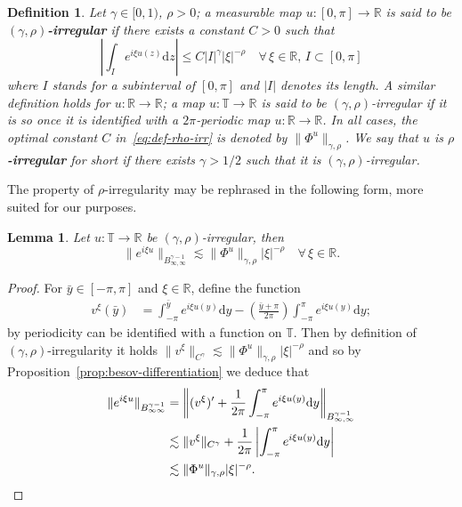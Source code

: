\documentclass[11pt,oneside,reqno]{amsart}
\newcommand{\mathd}{\mathrm{d}}
\newcommand{\tmdfn}[1]{\textbf{#1}}
\newtheorem{definition}[theorem]{Definition}
\newtheorem{lemma}[theorem]{Lemma}
\numberwithin{equation}{section}
\begin{document}
\begin{definition}
  \label{def:rho-irr}Let $\gamma \in [0, 1)$, $\rho > 0$; a measurable map $u
  : [0, \pi] \rightarrow \mathbb{R}$ is said to be {\tmdfn{$(\gamma,
  \rho)$-irregular}} if there exists a constant $C > 0$ such that
  \begin{equation}
    \left| \int_I e^{i \xi u (z)} \mathd z \right| \leqslant C | I |^{\gamma} 
    | \xi |^{- \rho} \quad \forall \, \xi \in \mathbb{R}, \, I \subset [0,
    \pi] \label{eq:def-rho-irr}
  \end{equation}
  where $I$ stands for a subinterval of $[0, \pi]$ and $| I |$ denotes its
  length. A similar definition holds for $u : \mathbb{R} \rightarrow
  \mathbb{R}$; a map $u : \mathbb{T} \rightarrow \mathbb{R}$ is said to be
  $(\gamma, \rho)$-irregular if it is so once it is identified with a $2
  \pi$-periodic map $u : \mathbb{R} \rightarrow \mathbb{R}$. In all cases, the
  optimal constant $C$ in~\eqref{eq:def-rho-irr} is denoted by $\| \Phi^u
  \|_{\gamma, \rho}$. We say that $u$ is {\tmdfn{$\rho$-irregular}} for short
  if there exists $\gamma > 1 / 2$ such that it is $(\gamma, \rho)$-irregular.
\end{definition}

The property of $\rho$-irregularity may be rephrased in the following form,
more suited for our purposes.

\begin{lemma}
  \label{lem:alternative-rho}Let $u : \mathbb{T} \rightarrow \mathbb{R}$ be
  $(\gamma, \rho)$-irregular, then
  \[ \| e^{i \xi u} \|_{B^{\gamma - 1}_{\infty, \infty}} \lesssim \| \Phi^u
     \|_{\gamma, \rho}  | \xi |^{- \rho} \quad \forall \, \xi \in \mathbb{R}.
  \]
\end{lemma}

\begin{proof}
  For $\bar{y} \in [- \pi, \pi]$ and $\xi \in \mathbb{R}$, define the function
%  
  \begin{align*}
    v^{\xi} (\bar{y}) & = \int_{- \pi}^{\bar{y}} e^{i \xi u (y)} \mathd y -
    \left( \frac{\bar{y} + \pi}{2 \pi} \right) \int_{- \pi}^{\pi} e^{i \xi u
    (y)} \mathd y ;
  \end{align*}
%  
  by periodicity can be identified with a function on $\mathbb{T}$. Then by
  definition of $(\gamma, \rho)$-irregularity it holds $\| v^{\xi}
  \|_{C^{\gamma}} \lesssim \| \Phi^u \|_{\gamma, \rho}  | \xi |^{- \rho}$ and
  so by Proposition~\ref{prop:besov-differentiation} we deduce that
\begin{equation*}\begin{split}
\| e^{i \xi u} \|_{B^{\gamma - 1}_{\infty \infty}} & = \left\|
       (v^{\xi})' + \frac{1}{2 \pi} \int_{- \pi}^{\pi} e^{i \xi u (y)} \mathd
       y \right\|_{B^{\gamma - 1}_{\infty, \infty}}\\
       & \lesssim \| v^{\xi} \|_{C^{\gamma}} + \frac{1}{2 \pi} \left|
       \int_{- \pi}^{\pi} e^{i \xi u (y)} \mathd y \right|\\
       & \lesssim \| \Phi^u \|_{\gamma, \rho}  | \xi |^{- \rho} . \qedhere
\end{split}\end{equation*}
\end{proof}
\end{document}
